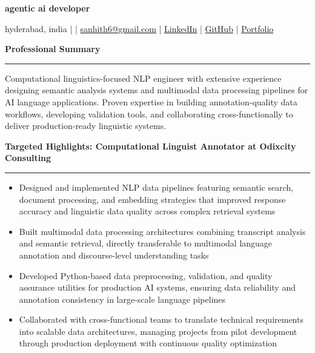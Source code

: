 \documentclass[9pt, letterpaper]{article}
\newcommand{\name}[1]{%
    \begin{center}
        {\LARGE \textbf{#1}}
    \end{center}
}
\newcommand{\sectionheading}[1]{%
    \vspace{4pt}%
    {\large \textbf{#1}}%
    \vspace{1pt}%
    \hrule
    \vspace{2pt}%
}
\begin{document}
\name{agentic ai developer}
\begin{center}
    hyderabad, india \quad |  \quad | \quad
    \href{mailto:sanhith6@gmail.com}{sanhith6@gmail.com} \quad | \quad
    \href{https://www.linkedin.com/in/sanhith-reddy-740a1625b/}{LinkedIn} \quad | \quad
    \href{https://github.com/tsanhith}{GitHub} \quad | \quad
    \href{https://johndoe.dev}{Portfolio}
\end{center}

\vspace{0pt}

\sectionheading{Professional Summary}
Computational linguistics-focused NLP engineer with extensive experience designing semantic analysis systems and multimodal data processing pipelines for AI language applications. Proven expertise in building annotation-quality data workflows, developing validation tools, and collaborating cross-functionally to deliver production-ready linguistic systems.

\sectionheading{Targeted Highlights: Computational Linguist Annotator at Odixcity Consulting}
\begin{itemize}[leftmargin=0.25in, itemindent=-0.15in, label={--}]
    \item Designed and implemented NLP data pipelines featuring semantic search, document processing, and embedding strategies that improved response accuracy and linguistic data quality across complex retrieval systems
    \item Built multimodal data processing architectures combining transcript analysis and semantic retrieval, directly transferable to multimodal language annotation and discourse-level understanding tasks
    \item Developed Python-based data preprocessing, validation, and quality assurance utilities for production AI systems, ensuring data reliability and annotation consistency in large-scale language pipelines
    \item Collaborated with cross-functional teams to translate technical requirements into scalable data architectures, managing projects from pilot development through production deployment with continuous quality optimization
\end{itemize}
\end{document}
